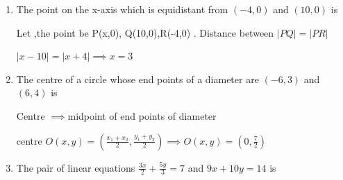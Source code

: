 \begin{enumerate}[label=\thesubsection.\arabic*, ref=\thesubsection.\theenumi]
	form \eqref{eq:ee26btech11222-prob_10 7}
	
	According to the theorem , $\frac{AD}{DB}=\frac{AE}{EC}$
	
	$\frac{2}{3}= \frac{EC}{AE} \implies EC= 1.8cm $
	
	\item The point on the x-axis which is equidistant from $(-4, 0)$ and $(10, 0)$ is
	
	\begin{enumerate}
	\end{enumerate}	
	\solution
	
	Let ,the point be P(x,0), Q(10,0),R(-4,0) . Distance between $\vert{}PQ\vert = \vert{}PR\vert{}$ 
	
	$\vert{}x-10\vert{} = \vert{}x+4\vert{} \implies x=3$
	
	\item 
	
	The centre of a circle whose end points of a diameter are $(-6, 3)$ and $(6, 4)$ is   
	\begin{enumerate}
		\begin{multicols}{4}
			\item $(8, -1)$   
			
			\item  $(4, 7)$ 
			
			\item  $\left(0, \frac{7}{2}\right)$
			
			\item  $\left(4, \frac{7}{2}\right)$
		\end{multicols}
	\end{enumerate}	
	\solution
	
	
	Centre $\implies $midpoint of end points of diameter  
	
	centre $O(x,y)= (\frac{x_1+x_2}{2},\frac{y_1+y_2}{2}) \implies O(x,y)= (0,\frac{7}{2})$
	
	\item 
	The pair of linear equations $\frac{3x}{2} + \frac{5y}{3} = 7$ and $9x + 10y = 14$ is   
	\begin{enumerate}
		

\end{enumerate}
\end{enumerate}
